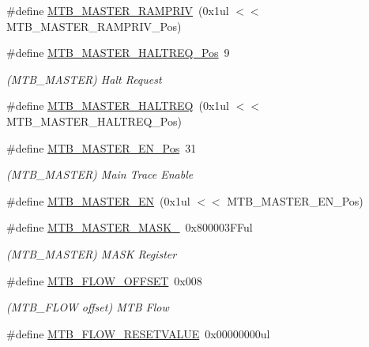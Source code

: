 \begin{DoxyCompactItemize}
\#define \mbox{\hyperlink{group___s_a_m_d21___m_t_b_ga578ef21836ea1ee0a56f0af70d22ce97}{M\+T\+B\+\_\+\+M\+A\+S\+T\+E\+R\+\_\+\+R\+A\+M\+P\+R\+IV}}~(0x1ul $<$$<$ M\+T\+B\+\_\+\+M\+A\+S\+T\+E\+R\+\_\+\+R\+A\+M\+P\+R\+I\+V\+\_\+\+Pos)
\item 
\#define \mbox{\hyperlink{group___s_a_m_d21___m_t_b_ga8a330adc9c36475c68783bf9bc740278}{M\+T\+B\+\_\+\+M\+A\+S\+T\+E\+R\+\_\+\+H\+A\+L\+T\+R\+E\+Q\+\_\+\+Pos}}~9
\begin{DoxyCompactList}\small\item\em (M\+T\+B\+\_\+\+M\+A\+S\+T\+ER) Halt Request \end{DoxyCompactList}\item 
\#define \mbox{\hyperlink{group___s_a_m_d21___m_t_b_gabbf8f04a1362e3988c6a5bf7638a5b7f}{M\+T\+B\+\_\+\+M\+A\+S\+T\+E\+R\+\_\+\+H\+A\+L\+T\+R\+EQ}}~(0x1ul $<$$<$ M\+T\+B\+\_\+\+M\+A\+S\+T\+E\+R\+\_\+\+H\+A\+L\+T\+R\+E\+Q\+\_\+\+Pos)
\item 
\#define \mbox{\hyperlink{group___s_a_m_d21___m_t_b_ga5c8356e28b7c4274d86b6342a4022a2d}{M\+T\+B\+\_\+\+M\+A\+S\+T\+E\+R\+\_\+\+E\+N\+\_\+\+Pos}}~31
\begin{DoxyCompactList}\small\item\em (M\+T\+B\+\_\+\+M\+A\+S\+T\+ER) Main Trace Enable \end{DoxyCompactList}\item 
\#define \mbox{\hyperlink{group___s_a_m_d21___m_t_b_ga3df3a47e8efa848f87d4805b4d6f497c}{M\+T\+B\+\_\+\+M\+A\+S\+T\+E\+R\+\_\+\+EN}}~(0x1ul $<$$<$ M\+T\+B\+\_\+\+M\+A\+S\+T\+E\+R\+\_\+\+E\+N\+\_\+\+Pos)
\item 
\#define \mbox{\hyperlink{group___s_a_m_d21___m_t_b_gab7418dbbb685e7ec4206ffaf98668c72}{M\+T\+B\+\_\+\+M\+A\+S\+T\+E\+R\+\_\+\+M\+A\+S\+K\+\_\+}}~0x800003\+F\+Ful
\begin{DoxyCompactList}\small\item\em (M\+T\+B\+\_\+\+M\+A\+S\+T\+ER) M\+A\+SK Register \end{DoxyCompactList}\item 
\#define \mbox{\hyperlink{group___s_a_m_d21___m_t_b_ga9d744a4798477f7c3262eee5c896acf5}{M\+T\+B\+\_\+\+F\+L\+O\+W\+\_\+\+O\+F\+F\+S\+ET}}~0x008
\begin{DoxyCompactList}\small\item\em (M\+T\+B\+\_\+\+F\+L\+OW offset) M\+TB Flow \end{DoxyCompactList}\item 
\#define \mbox{\hyperlink{group___s_a_m_d21___m_t_b_ga409fc345c6a2fa1d9b5979473041ddb9}{M\+T\+B\+\_\+\+F\+L\+O\+W\+\_\+\+R\+E\+S\+E\+T\+V\+A\+L\+UE}}~0x00000000ul
$$
\end{DoxyCompactItemize}
